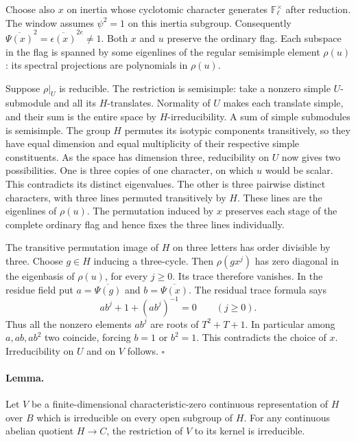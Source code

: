 Choose also \(x\) on inertia whose cyclotomic character generates
\(\mathbb F_\ell^\times\) after reduction. The window assumes
\(\psi^2=1\) on this inertia subgroup. Consequently
\(\overline{\Psi(x)}^2=\overline{\epsilon(x)}^{2e}\ne1\).
Both \(x\) and \(u\) preserve the ordinary flag. Each subspace
in the flag is spanned by some eigenlines of the regular semisimple
element \(\rho(u)\): its spectral projections are polynomials in
\(\rho(u)\).

Suppose \(\rho|_U\) is reducible. The restriction is semisimple:
take a nonzero simple \(U\)-submodule and all its \(H\)-translates.
Normality of \(U\) makes each translate simple, and their sum is
the entire space by \(H\)-irreducibility. A sum of simple
submodules is semisimple. The group \(H\) permutes its isotypic
components transitively, so they have equal dimension and equal
multiplicity of their respective simple constituents.
As the space has dimension three, reducibility on \(U\) now gives
two possibilities. One is three copies of one character, on which
\(u\) would be scalar. This contradicts its distinct eigenvalues.
The other is three pairwise distinct characters, with three lines
permuted transitively by \(H\). These lines are the eigenlines of
\(\rho(u)\). The permutation induced by \(x\) preserves each stage
of the complete ordinary flag and hence fixes the three lines
individually.

The transitive permutation image of \(H\) on three letters has
order divisible by three. Choose \(g\in H\) inducing a three-cycle.
Then \(\rho(gx^j)\) has zero diagonal in the eigenbasis of
\(\rho(u)\), for every \(j\ge0\). Its trace therefore vanishes.
In the residue field put \(a=\overline{\Psi(g)}\) and
\(b=\overline{\Psi(x)}\). The residual trace formula says
\[
 a b^j+1+(a b^j)^{-1}=0\qquad(j\ge0).
\]
Thus all the nonzero elements \(a b^j\) are roots of
\(T^2+T+1\). In particular among \(a,ab,ab^2\) two coincide,
forcing \(b=1\) or \(b^2=1\). This contradicts the choice of \(x\).
Irreducibility on \(U\) and on \(V\) follows. \(\square\)

\paragraph{Lemma.}
Let \(V\) be a finite-dimensional characteristic-zero continuous
representation of \(H\) over \(B\) which is irreducible on every
open subgroup of \(H\). For any continuous abelian quotient
\(H\to C\), the restriction of \(V\) to its kernel is irreducible.

